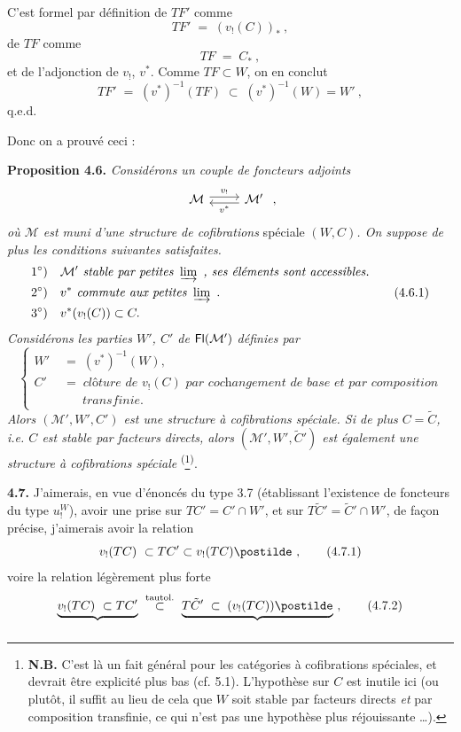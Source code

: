 C'est formel par définition de $TF'$ comme
\[
TF' \;=\; (v_!(C))_*\ ,
\]
de $TF$ comme
\[
TF \;=\; C_*\ ,
\]
et de l'adjonction de $v_!$, $v^*$. Comme $TF \subset W$, on en conclut
\[
TF' \;=\; (v^*)^{-1}(TF) \;\subset\; (v^*)^{-1}(W) = W'\ ,
\]
q.e.d.

Donc on a prouvé ceci :

\textbf{Proposition 4.6.} \textit{Considérons un couple de foncteurs adjoints}
\[
\begin{tikzcd}
\mathcal{M} \arrow[r, shift left, "v_!"] & \mathcal{M}' \arrow[l, shift left, "v^*"]
\end{tikzcd}
\ ,
\]
\textit{où $\mathcal{M}$ est muni d'une structure de cofibrations} spéciale $(W, C)$\textit{. On suppose de plus les conditions suivantes satisfaites.}
\[
\begin{aligned}
&1^\circ)\quad \mathcal{M}' \textit{ stable par petites } \varinjlim\ \textit{, ses éléments sont accessibles.} \\
&2^\circ)\quad v^* \textit{ commute aux petites } \varinjlim\ . \\
&3^\circ)\quad v^*(v_!(C)) \subset C.
\end{aligned} \tag*{(4.6.1)}
\]
\textit{Considérons les parties $W'$, $C'$ de} $\mathsf{Fl}(\mathcal{M}')$ \textit{définies par}
\[
\left\{
\begin{aligned}
W' \;&=\; (v^*)^{-1}(W), \\
C' \;&=\; \textit{clôture de } v_!(C) \textit{ par cochangement de base et par composition} \\
&\phantom{\;=\;}\ \textit{transfinie.}
\end{aligned}
\right. \tag*{(4.6.2)}
\]
\textit{Alors $(\mathcal{M}', W', C')$ est une structure à cofibrations spéciale. Si de plus $C = \tilde{C}$, i.e. $C$ est stable par facteurs directs, alors $(\mathcal{M}', W', \tilde{C}')$ est également une structure à cofibrations spéciale} \textsuperscript{(}\footnote[20]{\textbf{N.B.} C'est là un fait général pour les catégories à cofibrations spéciales, et devrait être explicité plus bas (cf. 5.1). L'hypothèse sur $C$ est inutile ici (ou plutôt, il suffit au lieu de cela que $W$ soit stable par facteurs directs \textit{et} par composition transfinie, ce qui n'est pas une hypothèse plus réjouissante \dots).}\textsuperscript{)}.

\textbf{4.7.} J'aimerais, en vue d'énoncés du type 3.7 (établissant l'existence de foncteurs du type $u_!^W$), avoir une prise sur $TC' = C'{\cap}W'$, et sur $T\tilde{C}' = \tilde{C}'{\cap}W'$, de façon précise, j'aimerais avoir la relation
\[
v_!(TC)\ \subset TC' \subset v_!(TC)\postilde\ , \tag*{(4.7.1)}
\]
voire la relation légèrement plus forte
\[
\underbrace{v_!(TC)\ \subset TC'}_{} \ \overset{\text{tautol.}}{\subset}\ \underbrace{T\tilde{C}' \;\subset\; (v_!(TC))\postilde}_{}\ , \tag*{(4.7.2)}
\]

